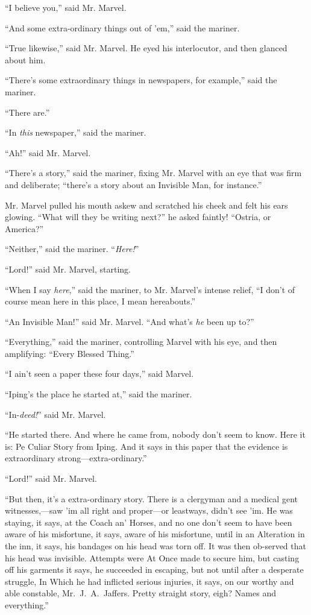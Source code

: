 “I believe you,” said Mr. Marvel.

“And some extra-ordinary things out of ’em,” said the mariner.

“True likewise,” said Mr. Marvel. He eyed his interlocutor, and then glanced about him.

“There’s some extraordinary things in newspapers, for example,” said the mariner.

“There are.”

“In \emph{this} newspaper,” said the mariner.

“Ah!” said Mr. Marvel.

“There’s a story,” said the mariner, fixing Mr. Marvel with an eye that was firm and deliberate; “there’s a story about an Invisible Man, for instance.”

Mr. Marvel pulled his mouth askew and scratched his cheek and felt his ears glowing. “What will they be writing next?” he asked faintly! “Ostria, or America?”

“Neither,” said the mariner. “\emph{Here!}”

“Lord!” said Mr. Marvel, starting.

“When I say \emph{here},” said the mariner, to Mr. Marvel’s intense relief, “I don’t of course mean here in this place, I mean hereabouts.”

“An Invisible Man!” said Mr. Marvel. “And what’s \emph{he} been up to?”

“Everything,” said the mariner, controlling Marvel with his eye, and then amplifying: “Every Blessed Thing.”

“I ain’t seen a paper these four days,” said Marvel.

“Iping’s the place he started at,” said the mariner.

“In-\emph{deed!}” said Mr. Marvel.

“He started there. And where he came from, nobody don’t seem to know. Here it is: Pe Culiar Story from Iping. And it says in this paper that the evidence is extraordinary strong—extra-ordinary.”

“Lord!” said Mr. Marvel.

“But then, it’s a extra-ordinary story. There is a clergyman and a medical gent witnesses,—saw ’im all right and proper—or leastways, didn’t see ’im. He was staying, it says, at the Coach an’ Horses, and no one don’t seem to have been aware of his misfortune, it says, aware of his misfortune, until in an Alteration in the inn, it says, his bandages on his head was torn off. It was then ob-served that his head was invisible. Attempts were At Once made to secure him, but casting off his garments it says, he succeeded in escaping, but not until after a desperate struggle, In Which he had inflicted serious injuries, it says, on our worthy and able constable, Mr.\ J.\ A.\ Jaffers. Pretty straight story, eigh? Names and everything.”

